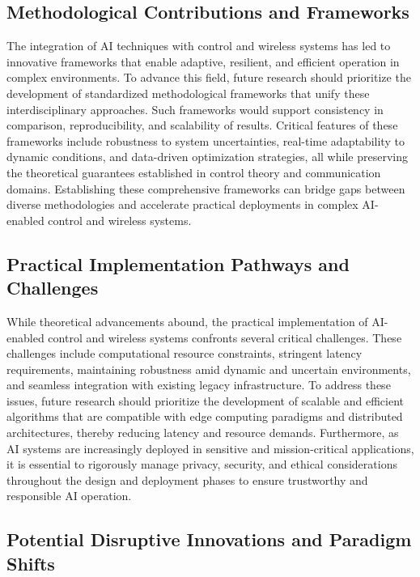 \documentclass[sigconf]{acmart}
\begin{document}
\subsection{Methodological Contributions and Frameworks}

The integration of AI techniques with control and wireless systems has led to innovative frameworks that enable adaptive, resilient, and efficient operation in complex environments. To advance this field, future research should prioritize the development of standardized methodological frameworks that unify these interdisciplinary approaches. Such frameworks would support consistency in comparison, reproducibility, and scalability of results. Critical features of these frameworks include robustness to system uncertainties, real-time adaptability to dynamic conditions, and data-driven optimization strategies, all while preserving the theoretical guarantees established in control theory and communication domains. Establishing these comprehensive frameworks can bridge gaps between diverse methodologies and accelerate practical deployments in complex AI-enabled control and wireless systems.

\subsection{Practical Implementation Pathways and Challenges}

While theoretical advancements abound, the practical implementation of AI-enabled control and wireless systems confronts several critical challenges. These challenges include computational resource constraints, stringent latency requirements, maintaining robustness amid dynamic and uncertain environments, and seamless integration with existing legacy infrastructure. To address these issues, future research should prioritize the development of scalable and efficient algorithms that are compatible with edge computing paradigms and distributed architectures, thereby reducing latency and resource demands. Furthermore, as AI systems are increasingly deployed in sensitive and mission-critical applications, it is essential to rigorously manage privacy, security, and ethical considerations throughout the design and deployment phases to ensure trustworthy and responsible AI operation.

\subsection{Potential Disruptive Innovations and Paradigm Shifts}
\end{document}
